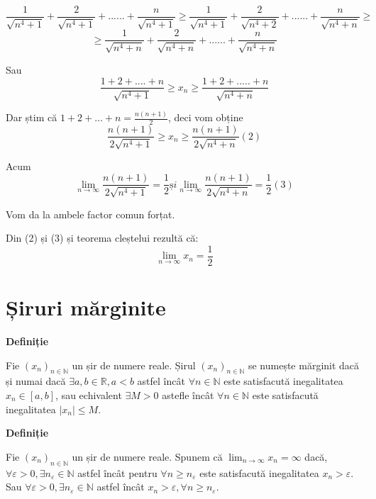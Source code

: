 \documentclass[a4paper,12pt,oneside]{report}
\begin{document}
\begin{enumerate}
\begin{displaymath}
  \frac{1}{\sqrt{n^{4}+1}}+ \frac{2}{\sqrt{n^{4}+1}}+......+ \frac{n}{\sqrt{n^{4}+1}} \geq \frac{1}{\sqrt{n^{4}+1}}+ \frac{2}{\sqrt{n^{4}+2}}+......+ \frac{n}{\sqrt{n^{4}+n}}\geq
\end{displaymath}
\begin{displaymath}
  \geq\frac{1}{\sqrt{n^{4}+n}}+ \frac{2}{\sqrt{n^{4}+n}}+......+ \frac{n}{\sqrt{n^{4}+n}}
\end{displaymath}


Sau
\begin{displaymath}
  \frac{1+2+....+n}{\sqrt{n^{4}+1}}\geq x_{n}\geq \frac{1+2+.....+n}{\sqrt{n^{4}+n}}
\end{displaymath}


Dar știm că \(1+2+...+n = \frac{n(n+1)}{2}\), deci vom obține 
\begin{displaymath}
  \frac{n(n+1)}{2\sqrt{n^{4}+1}}\geq x_{n}\geq \frac{n(n+1)}{2\sqrt{n^{4}+n}} (2)
\end{displaymath}

Acum 
\begin{displaymath}
  \lim_{n \to \infty }\frac{n(n+1)}{2\sqrt{n^{4}+1}}=\frac{1}{2} și \lim_{n \to \infty }\frac{n(n+1)}{2\sqrt{n^{4}+n}}=\frac{1}{2} (3)
\end{displaymath}


Vom da la ambele factor comun forțat. 

Din (2) și (3) și teorema cleștelui rezultă că:
\begin{displaymath}
  \lim_{n \to \infty }x_{n}=\frac{1}{2}
\end{displaymath}
\end{enumerate}


\chapter{Șiruri mărginite}

\textbf{Definiție}

Fie \((x_{n})_{n\in \mathbb{N}}\) un șir de numere reale. Șirul \((x_{n})_{n\in \mathbb{N}}\) se numește mărginit dacă și numai dacă \(\exists  a, b \in \mathbb{R}, a< b\) astfel încât \(\forall n\in \mathbb{N}\) este satisfacută inegalitatea \(x_{n}\in \left [ a,b \right ]\), sau echivalent \(\exists M> 0\) astefle încât \(\forall  n\in \mathbb{N}\) este satisfacută inegalitatea \(\left | x_{n} \right |\leq M\).

\textbf{Definiție }

Fie \((x_{n})_{n\in \mathbb{N}}\) un șir de numere reale. Spunem că \(\lim_{n \to \infty }x_{n}=\infty\) dacă, \(\forall \varepsilon > 0,\exists n_{\varepsilon }\in \mathbb{N}\) astfel încât pentru \(\forall n\geq n_{\varepsilon }\) este satisfacută inegalitatea \(x_{n}> \varepsilon\). 
Sau \(\forall \varepsilon > 0,\exists n_{\varepsilon }\in \mathbb{N}\) astfel încât \(x_{n}> \varepsilon ,\forall n\geq n_{\varepsilon }\). 
\end{document}
